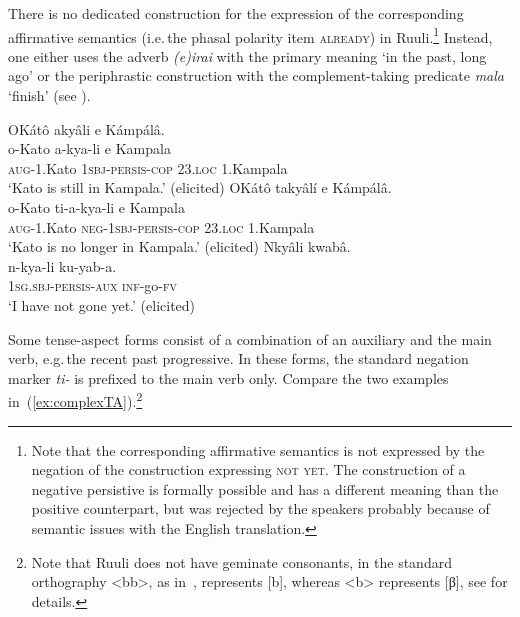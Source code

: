 \documentclass[output=paper,colorlinks,citecolor=brown,draftmode]{langscibook}
\begin{document}
There is no dedicated construction for the expression of the corresponding affirmative semantics (i.e.\,the phasal polarity item \textsc{already}) in Ruuli.\footnote{Note that the corresponding affirmative semantics is not expressed by the negation of the construction expressing \textsc{not yet}. 
The construction of a negative persistive is formally possible and has a different meaning than the positive counterpart, but was rejected by the speakers probably because of semantic issues with the English translation.} 
Instead, one either uses the adverb \textit{(e)irai} with the primary meaning `in the past, long ago' or the periphrastic construction with the complement-taking predicate \textit{mala} ‘finish’ (see \citealt{MolochievaEtAl2021}). 

\ea\label{ex:standardpersistive}\label{ex:ruulietal:4}
\begin{xlist}
	\ex \label{ex:still}
	\glll   OKátô akyâli e Kámpálâ.\\ %
	        o-Kato a-kya-li e Kampala\\
		    \textsc{aug}-1.Kato 1\textsc{sbj}-\textsc{persis}-\textsc{cop} 23.\textsc{loc} 1.Kampala\\
\glt        ‘Kato is still in Kampala.’  (elicited)
	\ex \label{ex:nolonger}
	\glll    OKátô takyâlí e Kámpálâ.\\
	        o-Kato ti-a-kya-li e Kampala\\
		    \textsc{aug}-1.Kato \textsc{neg}-1\textsc{sbj}-\textsc{persis}-\textsc{cop} 23.\textsc{loc} 1.Kampala\\
\glt        ‘Kato is no longer in Kampala.’  (elicited)
	\ex \label{ex:pers}
	\glll    Nkyâli kwabâ.\\
	        n-kya-li ku-yab-a.\\
		    1\textsc{sg.sbj}-\textsc{persis}-\textsc{aux} \textsc{inf}-go-\textsc{fv}\\
\glt        ‘I have not gone yet.’ (elicited)
\end{xlist}
\z

Some tense-aspect forms consist of a combination of an auxiliary and the main verb, e.g.\,the recent past progressive. 
In these forms, the standard negation marker \textit{ti-} is prefixed to the main verb only. Compare the two examples in~(\ref{ex:complexTA}).\footnote{Note that Ruuli does not have geminate consonants, in the standard orthography <bb>, as in~, represents [b], whereas <b> represents [β], see \citet[27–28]{NamyaloEtAl2021} for details.} 
\end{document}
